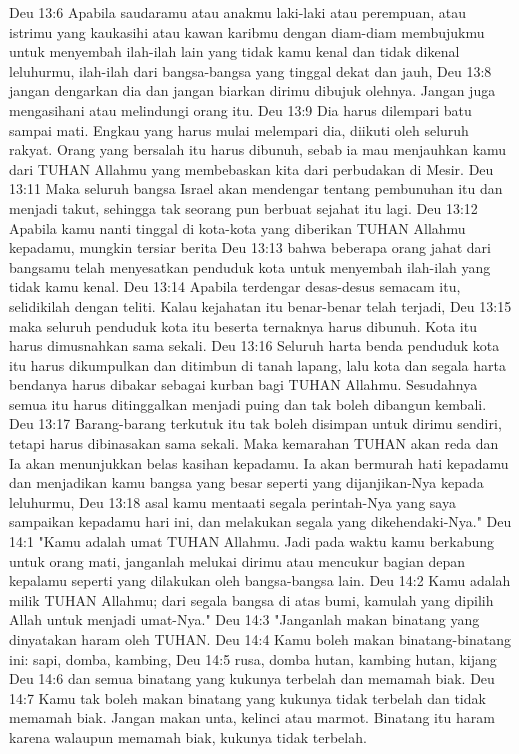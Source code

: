 Deu 13:6  Apabila saudaramu atau anakmu laki-laki atau perempuan, atau istrimu yang kaukasihi atau kawan karibmu dengan diam-diam membujukmu untuk menyembah ilah-ilah lain yang tidak kamu kenal dan tidak dikenal leluhurmu, ilah-ilah dari bangsa-bangsa yang tinggal dekat dan jauh,
Deu 13:8  jangan dengarkan dia dan jangan biarkan dirimu dibujuk olehnya. Jangan juga mengasihani atau melindungi orang itu.
Deu 13:9  Dia harus dilempari batu sampai mati. Engkau yang harus mulai melempari dia, diikuti oleh seluruh rakyat. Orang yang bersalah itu harus dibunuh, sebab ia mau menjauhkan kamu dari TUHAN Allahmu yang membebaskan kita dari perbudakan di Mesir.
Deu 13:11  Maka seluruh bangsa Israel akan mendengar tentang pembunuhan itu dan menjadi takut, sehingga tak seorang pun berbuat sejahat itu lagi.
Deu 13:12  Apabila kamu nanti tinggal di kota-kota yang diberikan TUHAN Allahmu kepadamu, mungkin tersiar berita
Deu 13:13  bahwa beberapa orang jahat dari bangsamu telah menyesatkan penduduk kota untuk menyembah ilah-ilah yang tidak kamu kenal.
Deu 13:14  Apabila terdengar desas-desus semacam itu, selidikilah dengan teliti. Kalau kejahatan itu benar-benar telah terjadi,
Deu 13:15  maka seluruh penduduk kota itu beserta ternaknya harus dibunuh. Kota itu harus dimusnahkan sama sekali.
Deu 13:16  Seluruh harta benda penduduk kota itu harus dikumpulkan dan ditimbun di tanah lapang, lalu kota dan segala harta bendanya harus dibakar sebagai kurban bagi TUHAN Allahmu. Sesudahnya semua itu harus ditinggalkan menjadi puing dan tak boleh dibangun kembali.
Deu 13:17  Barang-barang terkutuk itu tak boleh disimpan untuk dirimu sendiri, tetapi harus dibinasakan sama sekali. Maka kemarahan TUHAN akan reda dan Ia akan menunjukkan belas kasihan kepadamu. Ia akan bermurah hati kepadamu dan menjadikan kamu bangsa yang besar seperti yang dijanjikan-Nya kepada leluhurmu,
Deu 13:18  asal kamu mentaati segala perintah-Nya yang saya sampaikan kepadamu hari ini, dan melakukan segala yang dikehendaki-Nya."
Deu 14:1  "Kamu adalah umat TUHAN Allahmu. Jadi pada waktu kamu berkabung untuk orang mati, janganlah melukai dirimu atau mencukur bagian depan kepalamu seperti yang dilakukan oleh bangsa-bangsa lain.
Deu 14:2  Kamu adalah milik TUHAN Allahmu; dari segala bangsa di atas bumi, kamulah yang dipilih Allah untuk menjadi umat-Nya."
Deu 14:3  "Janganlah makan binatang yang dinyatakan haram oleh TUHAN.
Deu 14:4  Kamu boleh makan binatang-binatang ini: sapi, domba, kambing,
Deu 14:5  rusa, domba hutan, kambing hutan, kijang
Deu 14:6  dan semua binatang yang kukunya terbelah dan memamah biak.
Deu 14:7  Kamu tak boleh makan binatang yang kukunya tidak terbelah dan tidak memamah biak. Jangan makan unta, kelinci atau marmot. Binatang itu haram karena walaupun memamah biak, kukunya tidak terbelah.
